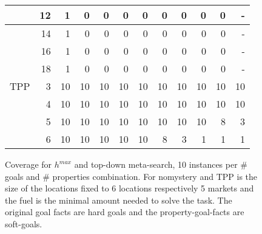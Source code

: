 \begin{figure}[ht]
\begin{tabular}{l|r|rrrrrrrrrr}
				& 12 & 1 & 0 & 0 & 0 & 0 & 0 & 0 & 0 & 0 & - \\\hline 
				& 14 & 1 & 0 & 0 & 0 & 0 & 0 & 0 & 0 & 0 & - \\\hline 
				& 16 & 1 & 0 & 0 & 0 & 0 & 0 & 0 & 0 & 0 & - \\\hline 
				& 18 & 1 & 0 & 0 & 0 & 0 & 0 & 0 & 0 & 0 & - \\\hline\hline
		TPP & 3 & 10 & 10 & 10 & 10 & 10 & 10 & 10 & 10 & 10 & 10\\\hline
			& 4 & 10 & 10 & 10 & 10 & 10 & 10 & 10 & 10 & 10 & 10\\\hline
			& 5 & 10 & 10 & 10 & 10 & 10 & 10 & 10 & 10 & 8 & 3\\\hline
			& 6 & 10 & 10 & 10 & 10 & 10 & 8 & 3 & 1 & 1 & 1\\\hline


	\end{tabular}
	\caption{Coverage for $h^{max}$ and top-down meta-search, 10 instances per \# goals and \# properties combination.
	For nomystery and TPP is the size of the locations fixed to 6 locations respectively 5 markets and the fuel is the 
	minimal amount needed to solve the task.
	The original goal facts are hard goals and the property-goal-facts are soft-goals.}
\end{figure}




